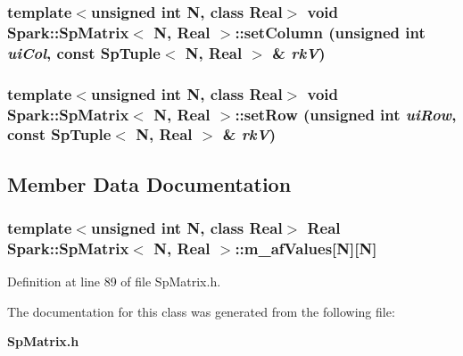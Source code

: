 \subsubsection{\setlength{\rightskip}{0pt plus 5cm}template$<$unsigned int N, class Real$>$ void {\bf Spark::Sp\-Matrix}$<$ N, Real $>$::set\-Column (unsigned int {\em ui\-Col}, const {\bf Sp\-Tuple}$<$ N, Real $>$ \& {\em rk\-V})}\label{classSpark_1_1SpMatrix_a12}


\subsubsection{\setlength{\rightskip}{0pt plus 5cm}template$<$unsigned int N, class Real$>$ void {\bf Spark::Sp\-Matrix}$<$ N, Real $>$::set\-Row (unsigned int {\em ui\-Row}, const {\bf Sp\-Tuple}$<$ N, Real $>$ \& {\em rk\-V})}\label{classSpark_1_1SpMatrix_a10}




\subsection{Member Data Documentation}
\subsubsection{\setlength{\rightskip}{0pt plus 5cm}template$<$unsigned int N, class Real$>$ Real {\bf Spark::Sp\-Matrix}$<$ N, Real $>$::{\bf m\_\-af\-Values}[N][N]\hspace{0.3cm}{\tt  [protected]}}\label{classSpark_1_1SpMatrix_p0}


Definition at line 89 of file Sp\-Matrix.h.

The documentation for this class was generated from the following file:\begin{CompactItemize}
\item 
{\bf Sp\-Matrix.h}\end{CompactItemize}
